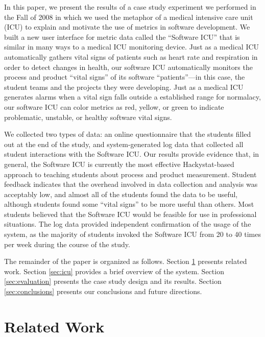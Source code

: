 \documentclass{acm_proc_article-sp}
\begin{document}
In this paper, we present the results of a case study experiment we
performed in the Fall of 2008 in which we used the metaphor of a medical
intensive care unit (ICU) to explain and motivate the use of metrics in
software development.  We built a new user interface for metric data called
the ``Software ICU'' that is similar in many ways to a medical ICU
monitoring device.  Just as a medical ICU automatically gathers vital signs
of patients such as heart rate and respiration in order to detect changes
in health, our software ICU automatically monitors the process and product
``vital signs'' of its software ``patients''---in this case, the student
teams and the projects they were developing.  Just as a medical ICU
generates alarms when a vital sign falls outside a established range for
normalacy, our software ICU can color metrics as red, yellow, or green to
indicate problematic, unstable, or healthy software vital signs. 

We collected two types of data: an online questionnaire that the students
filled out at the end of the study, and system-generated log data that
collected all student interactions with the Software ICU.  Our results
provide evidence that, in general, the Software ICU is currently the most
effective Hackystat-based approach to teaching students about process and
product measurement.  Student feedback indicates that the overhead involved
in data collection and analysis was acceptably low, and almost all of the
students found the data to be useful, although students found some ``vital
signs'' to be more useful than others. Most students believed that the
Software ICU would be feasible for use in professional situations.  The log
data provided independent confirmation of the usage of the system, as the
majority of students invoked the Software ICU from 20 to 40 times per week
during the course of the study.

The remainder of the paper is organized as follows.  Section
\ref{sec:related} presents related work.  Section \ref{sec:icu} provides a
brief overview of the system. Section \ref{sec:evaluation} presents the
case study design and its results.  Section \ref{sec:conclusions} presents
our conclusions and future directions.

\section {Related Work}
\label{sec:related}
\end{document}
